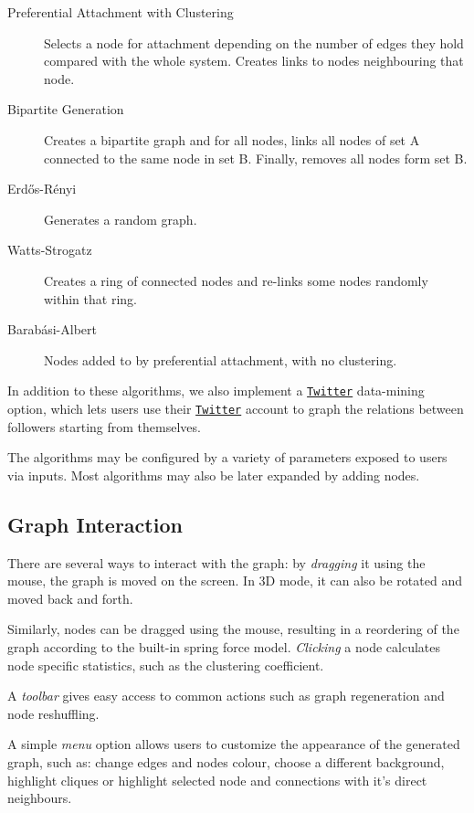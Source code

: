 \documentclass[a4paper,11pt,titlepage]{article}
\let\stdhref\href
\renewcommand{\href}[2]{\stdhref{#1}{\texttt{#2}}}
\newcommand{\Twitter}{\href{http://twitter.com}{Twitter} }
\begin{document}
\begin{description}
\item [Preferential Attachment with Clustering] Selects a node for attachment
  depending on the number of edges they hold compared with the whole
  system. Creates links to nodes neighbouring that node.

\item [Bipartite Generation] Creates a bipartite graph and for all nodes, links
  all nodes of set A connected to the same node in set B. Finally, removes all
  nodes form set B.

\item [Erd\H{o}s-R\'{e}nyi] Generates a random graph.

\item [Watts-Strogatz] Creates a ring of connected nodes and re-links some nodes
  randomly within that ring.

\item [Barab\'{a}si-Albert] Nodes added to by preferential attachment, with no
  clustering.
\end{description}

In addition to these algorithms, we also implement a \Twitter data-mining
option, which lets users use their \Twitter account to graph the relations
between followers starting from themselves.

The algorithms may be configured by a variety of parameters exposed to users
via inputs. Most algorithms may also be later expanded by adding nodes.

\subsection{Graph Interaction}
There are several ways to interact with the graph: by \emph{dragging} it using
the mouse, the graph is moved on the screen. In 3D mode, it can also be rotated
and moved back and forth.

Similarly, nodes can be dragged using the mouse, resulting in a reordering of
the graph according to the built-in spring force model. \emph{Clicking} a node
calculates node specific statistics, such as the clustering coefficient.

A \emph{toolbar} gives easy access to common actions such as graph regeneration
and node reshuffling.

A simple \emph{menu} option allows users to customize the appearance of the
generated graph, such as: change edges and nodes colour, choose a different
background, highlight cliques or highlight selected node and connections with
it's direct neighbours.
\end{document}

